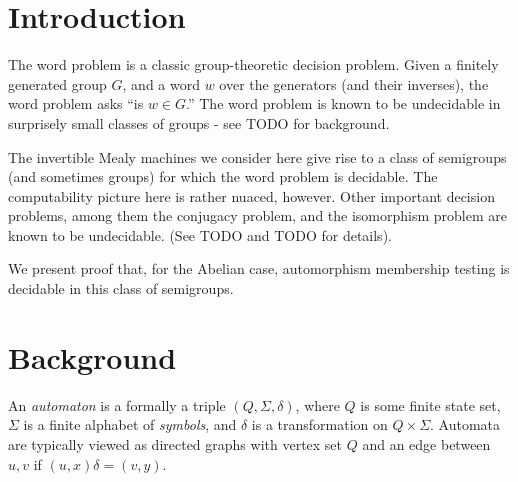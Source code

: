 \documentclass[10pt]{article}
\newcommand{\defn}[1]{\textit{#1}}
\begin{document}
\pagestyle{plain}
\title{\rmfamily\normalfont{}} \author{} \date{May 5, 2017}

\maketitle

\begin{abstract}
  We consider a variety of decision problems in groups and semigroups
  induced by invertible Mealy machines. Notably, we present proof that
  the automorphism membership problem in decidable in these
  semigroups. In addition, we prove undecidability of a Knapsack
  variant. A discussion of iteration and orbit rationality follows.
\end{abstract}

\tableofcontents

\section{Introduction}
The word problem is a classic group-theoretic decision problem. Given
a finitely generated group $G$, and a word $w$ over the generators
(and their inverses), the word problem asks ``is $w \in G$.'' The word
problem is known to be undecidable in surprisely small classes of
groups - see TODO for background.

The invertible Mealy machines we consider here give rise to a class of
semigroups (and sometimes groups) for which the word problem is
decidable. The computability picture here is rather nuaced,
however. Other important decision problems, among them the conjugacy
problem, and the isomorphism problem are known to be undecidable. (See
TODO and TODO for details).

We present proof that, for the Abelian case, automorphism membership
testing is decidable in this class of semigroups.

\section{Background}
An \defn{automaton} is a formally a triple $(Q, \Sigma, \delta)$,
where $Q$ is some finite state set, $\Sigma$ is a finite alphabet of
\defn{symbols}, and $\delta$ is a transformation on $Q \times \Sigma$.
Automata are typically viewed as directed graphs with vertex set $Q$
and an edge between $u, v$ if $(u, x)\delta = (v, y)$.
\end{document}

